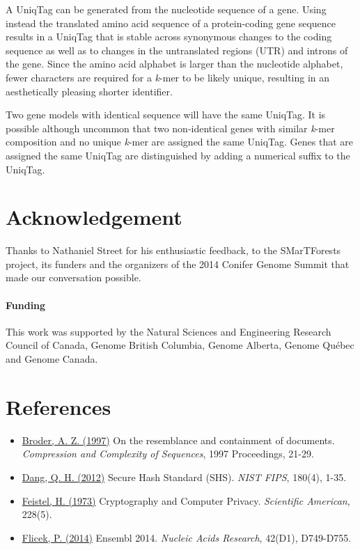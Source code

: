 \documentclass{bioinfo}
\begin{document}
A UniqTag can be generated from the nucleotide sequence of a gene. Using
instead the translated amino acid sequence of a protein-coding gene
sequence results in a UniqTag that is stable across synonymous changes
to the coding sequence as well as to changes in the untranslated regions
(UTR) and introns of the gene. Since the amino acid alphabet is larger
than the nucleotide alphabet, fewer characters are required for a
\emph{k}-mer to be likely unique, resulting in an aesthetically pleasing
shorter identifier.

Two gene models with identical sequence will have the same UniqTag. It
is possible although uncommon that two non-identical genes with similar
\emph{k}-mer composition and no unique \emph{k}-mer are assigned the
same UniqTag. Genes that are assigned the same UniqTag are distinguished
by adding a numerical suffix to the UniqTag.

\section*{Acknowledgement}

Thanks to Nathaniel Street for his enthusiastic feedback, to the
SMarTForests project, its funders and the organizers of the 2014 Conifer
Genome Summit that made our conversation possible.

\paragraph{Funding\textcolon}
This work was supported by the Natural Sciences and Engineering Research
Council of Canada, Genome British Columbia, Genome Alberta, Genome
Québec and Genome Canada.

\section*{References}

\begin{itemize}
\itemsep1pt\parskip0pt
\item[]
  \href{http://dx.doi.org/10.1109/SEQUEN.1997.666900}{Broder, A. Z.
  (1997)} On the resemblance and containment of documents.
  \emph{Compression and Complexity of Sequences}, 1997 Proceedings,
  21-29.
\item[]
  \href{http://www.nist.gov/manuscript-publication-search.cfm?pub_id=910977}{Dang,
  Q. H. (2012)} Secure Hash Standard (SHS). \emph{NIST FIPS}, 180(4),
  1-35.
\item[]
  \href{http://www.scientificamerican.com/article/cryptography-and-computer-privacy/}{Feistel,
  H. (1973)} Cryptography and Computer Privacy. \emph{Scientific
  American}, 228(5).
\item[]
  \href{http://dx.doi.org/10.1093/nar/gkt1196}{Flicek, P. (2014)}
  Ensembl 2014. \emph{Nucleic Acids Research}, 42(D1), D749-D755.
\end{itemize}
\end{document}
